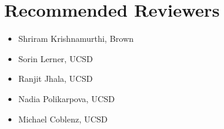 \section*{Recommended Reviewers}


\begin{itemize}
  \item Shriram Krishnamurthi, Brown
  \item Sorin Lerner, UCSD
  \item Ranjit Jhala, UCSD
  \item Nadia Polikarpova, UCSD
  \item Michael Coblenz, UCSD
\end{itemize}

\iflater
{}
\fi
